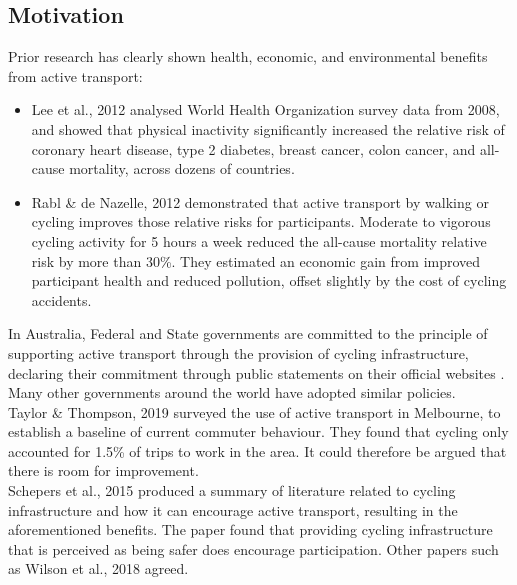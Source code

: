 \documentclass{article}
\begin{document}
\subsection{Motivation}

Prior research has clearly shown health, economic, and environmental benefits from active transport:
\begin{itemize}
\item{Lee et al., 2012 \cite{LEE2012219} analysed World Health Organization survey data from 2008, and showed that physical inactivity significantly increased the relative risk of coronary heart disease, type 2 diabetes, breast cancer, colon cancer, and all-cause mortality, across dozens of countries.}
\item{Rabl \& de Nazelle, 2012 \cite{RABL2012121} demonstrated that active transport by walking or cycling improves those relative risks for participants.  Moderate to vigorous cycling activity for 5 hours a week reduced the all-cause mortality relative risk by more than 30\%.  They estimated an economic gain from improved participant health and reduced pollution, offset slightly by the cost of cycling accidents.}
\end{itemize}

In Australia, Federal and State governments are committed to the principle of supporting active transport through the provision of cycling infrastructure, declaring their commitment through public statements on their official websites \cite{federal_policy_2019} \cite{state_policy_2020}.  Many other governments around the world have adopted similar policies.
\\

Taylor \& Thompson, 2019 \cite{melbactive} surveyed the use of active transport in Melbourne, to establish a baseline of current commuter behaviour.  They found that cycling only accounted for 1.5\% of trips to work in the area.  It could therefore be argued that there is room for improvement.
\\

Schepers et al., 2015 \cite{SCHEPERS2015460} produced a summary of literature related to cycling infrastructure and how it can encourage active transport, resulting in the aforementioned benefits.  The paper found that providing cycling infrastructure that is perceived as being safer does encourage participation.  Other papers such as Wilson et al., 2018 \cite{WILSON2018234} agreed.
\\
\end{document}

